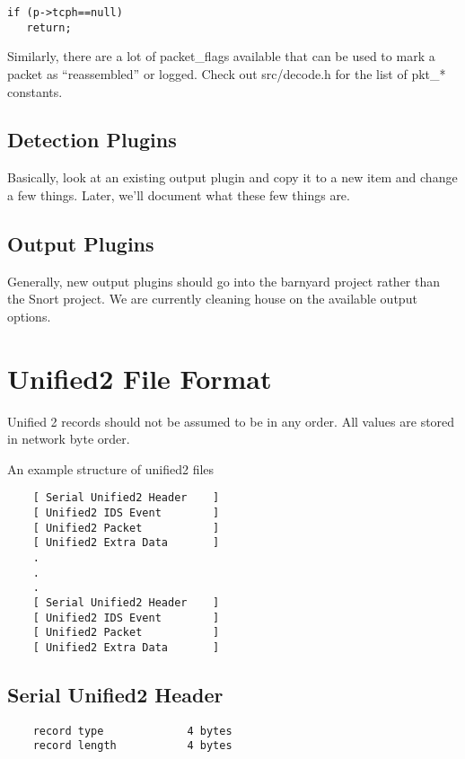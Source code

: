 \documentclass[english]{report}
\begin{document}
\begin{verbatim}
if (p->tcph==null)
   return;
\end{verbatim}

Similarly, there are a lot of packet\_flags available that can be used to mark
a packet as ``reassembled'' or logged. Check out src/decode.h for the list of
pkt\_{*} constants.

\subsection{Detection Plugins}

Basically, look at an existing output plugin and copy it to a new item and
change a few things. Later, we'll document what these few things are.

\subsection{Output Plugins}

Generally, new output plugins should go into the barnyard project rather than
the Snort project. We are currently cleaning house on the available output
options.

\section{Unified2 File Format}

  Unified 2 records should not be assumed to be in any order.  All
  values are stored in network byte order.

    An example structure of unified2 files

\begin{verbatim}
    [ Serial Unified2 Header    ]
    [ Unified2 IDS Event        ]
    [ Unified2 Packet           ]
    [ Unified2 Extra Data       ]
    .
    .
    .
    [ Serial Unified2 Header    ]
    [ Unified2 IDS Event        ]
    [ Unified2 Packet           ]
    [ Unified2 Extra Data       ]
\end{verbatim}

\subsection{Serial Unified2 Header}

\begin{verbatim}
    record type             4 bytes
    record length           4 bytes
\end{verbatim}
\end{document}
